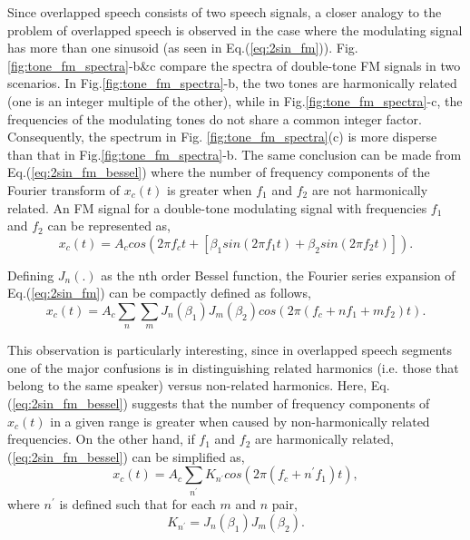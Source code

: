 {Since overlapped speech consists of two speech signals, a closer analogy to the problem of overlapped speech is observed in the case where the modulating signal has more than one sinusoid (as seen in Eq.(\ref{eq:2sin_fm})). 
Fig.\ref{fig:tone_fm_spectra}-b\&c compare the spectra of double-tone FM signals in two scenarios. 
In Fig.\ref{fig:tone_fm_spectra}-b, the two tones are harmonically related (one is an integer multiple of the other), while in Fig.\ref{fig:tone_fm_spectra}-c, the frequencies of the modulating tones do not share a common integer factor. 
Consequently, the spectrum in Fig. \ref{fig:tone_fm_spectra}(c) is more disperse than that in Fig.\ref{fig:tone_fm_spectra}-b. 
The same conclusion can be made from Eq.(\ref{eq:2sin_fm_bessel}) where the number of frequency components of the Fourier transform of $x_c(t)$ is greater when $f_1$ and $f_2$ are not harmonically related. 
An FM signal for a double-tone modulating signal with frequencies $f_1$ and $f_2$ can be represented as,
\begin{equation}
\label{eq:2sin_fm}
x_c(t) = A_ccos(2\pi f_ct+[\beta_1 sin(2\pi f_1t) + \beta_2 sin(2\pi f_2t)]).
\end{equation}

Defining $J_n(.)$ as the nth order Bessel function, the Fourier series expansion of Eq.(\ref{eq:2sin_fm}) can be compactly defined as follows, 
\begin{equation}
\label{eq:2sin_fm_bessel}
x_c(t) = A_c\sum\limits_n\sum\limits_m J_n(\beta_1)J_m(\beta_2)cos(2\pi (f_c+nf_1+mf_2)t).
\end{equation}

This observation is particularly interesting, since in overlapped speech segments one of the major confusions is in distinguishing related harmonics (i.e. those that belong to the same speaker) versus non-related harmonics. 
Here, Eq.(\ref{eq:2sin_fm_bessel}) suggests that the number of frequency components of $x_c(t)$ in a given range is greater when caused by non-harmonically related frequencies. 
On the other hand, if $f_1$ and $f_2$ are harmonically related, (\ref{eq:2sin_fm_bessel}) can be simplified as, 
\begin{equation}
\label{eq:2sin_fm_bessel_simplified}
x_c(t) = A_c\sum\limits_{n^\prime} K_{n^\prime}cos(2\pi (f_c + n^\prime f_1)t),
\end{equation}
where $n^\prime$ is defined such that for each $m$ and $n$ pair,
\begin{equation}
\label{eq:knprime}
K_{n^\prime} = J_n(\beta_1)J_m(\beta_2). 
\end{equation}

}
